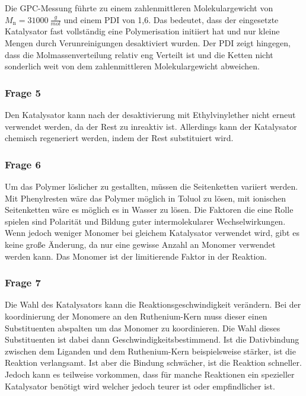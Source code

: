 \documentclass[10pt,a4paper,ngerman]{scrartcl}
\begin{document}
			Die GPC-Messung führte zu einem zahlenmittleren Molekulargewicht von $M_\text{n} = \SI{31000}{\frac{g}{mol}}$ und einem PDI von 1,6. 
			Das bedeutet, dass der eingesetzte Katalysator fast vollständig eine Polymerisation initiiert hat und nur kleine Mengen durch 
			Verunreinigungen desaktiviert wurden. Der PDI zeigt hingegen, dass die Molmassenverteilung relativ eng Verteilt ist und die Ketten nicht 
			sonderlich weit von dem zahlenmittleren Molekulargewicht abweichen.

		\subsubsection{Frage 5}

			Den Katalysator kann nach der desaktivierung mit Ethylvinylether nicht erneut verwendet werden, da der Rest zu inreaktiv ist. Allerdings kann der Katalysator 
			chemisch regeneriert werden, indem der Rest substituiert wird. 

		\subsubsection{Frage 6}

			Um das Polymer löslicher zu gestallten, müssen die Seitenketten variiert werden. Mit Phenylresten wäre das Polymer möglich in Toluol zu lösen, mit ionischen 
			Seitenketten wäre es möglich es in Wasser zu lösen. Die Faktoren die eine Rolle spielen sind Polarität und Bildung guter intermolekularer Wechselwirkungen.
			Wenn jedoch weniger Monomer bei gleichem Katalysator verwendet wird, gibt es keine große Änderung, da nur eine gewisse Anzahl an Monomer verwendet werden kann.
			Das Monomer ist der limitierende Faktor in der Reaktion. 

		\subsubsection{Frage 7}

			Die Wahl des Katalysators kann die Reaktionsgeschwindigkeit verändern. Bei der koordinierung der Monomere an den Ruthenium-Kern muss dieser einen Substituenten 
			abspalten um das Monomer zu koordinieren. Die Wahl dieses Substituenten ist dabei dann Geschwindigkeitsbestimmend. Ist die Dativbindung zwischen dem Liganden und 
			dem Ruthenium-Kern beispielsweise stärker, ist die Reaktion verlangsamt. Ist aber die Bindung schwächer, ist die Reaktion schneller.
			Jedoch kann es teilweise vorkommen, dass für manche Reaktionen ein spezieller Katalysator benötigt wird welcher jedoch teurer ist oder empfindlicher ist.
		
\end{document}
